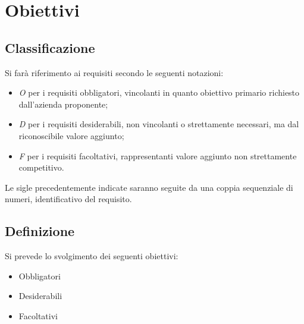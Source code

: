 
\section{Obiettivi}
	\subsection{Classificazione}
		Si farà riferimento ai requisiti secondo le seguenti notazioni:
		\begin{itemize}
			\item \textit{O} per i requisiti obbligatori, vincolanti in quanto obiettivo primario richiesto dall'azienda proponente;
			\item \textit{D} per i requisiti desiderabili, non vincolanti o strettamente necessari, ma dal riconoscibile valore aggiunto;
			\item \textit{F} per i requisiti facoltativi, rappresentanti valore aggiunto non strettamente competitivo.
		\end{itemize}
		
		Le sigle precedentemente indicate saranno seguite da una coppia sequenziale di numeri, identificativo del requisito.
	
	\subsection{Definizione}
		Si prevede lo svolgimento dei seguenti obiettivi:
		\begin{itemize}
			\item Obbligatori
			\begin{itemize}
				\obiettiviObbligatori
			\end{itemize}
			
			\item Desiderabili 
			\begin{itemize}
				\obiettiviDesiderabili
			\end{itemize}
			
			\item Facoltativi
			\begin{itemize}
				\obiettiviFacoltativi
			\end{itemize} 
		\end{itemize}
